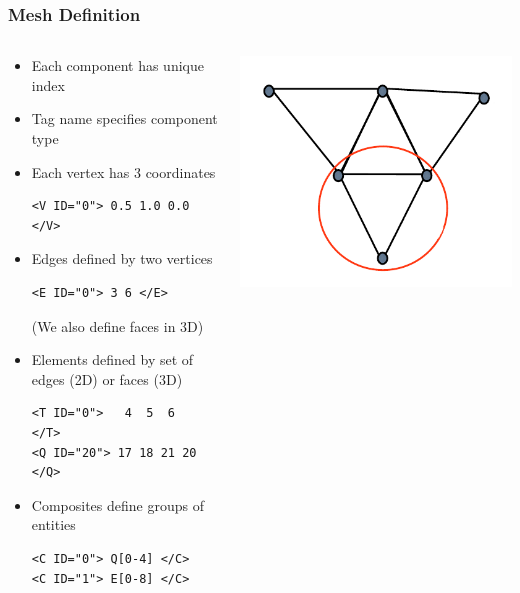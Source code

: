 \documentclass{beamer}
\numberwithin{figure}{section}
\numberwithin{equation}{section}
\begin{document}
\begin{frame}[fragile]
\frametitle{Mesh Definition}
\begin{minipage}[c][0.9\textheight][t]{\linewidth}
\begin{columns}
\begin{column}[l]{7cm}
\begin{itemize}
  \item Each component has unique index
  \item Tag name specifies component type
  \item Each vertex has 3 coordinates
  \begin{lstlisting}
<V ID="0"> 0.5 1.0 0.0 </V>
  \end{lstlisting}
  \item Edges defined by two vertices
  \begin{lstlisting}
<E ID="0"> 3 6 </E>
  \end{lstlisting}
  (We also define faces in 3D)
  \item Elements defined by set of edges (2D) or faces (3D)
  \begin{lstlisting}
<T ID="0">   4  5  6    </T>
<Q ID="20"> 17 18 21 20 </Q>
  \end{lstlisting}
  \item Composites define groups of entities
  \begin{lstlisting}
<C ID="0"> Q[0-4] </C>
<C ID="1"> E[0-8] </C>
  \end{lstlisting}
\end{itemize}
\end{column}
\begin{column}[l]{4cm}
\vspace{-20mm}
    \includegraphics[width=\textwidth]{mesh}\\

\end{column}
\end{columns}
\end{minipage}
\end{frame}
\end{document}

